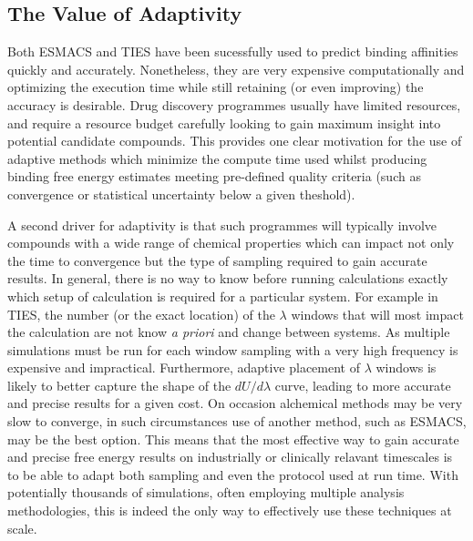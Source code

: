 
\subsection{The Value of Adaptivity}

Both ESMACS and TIES have been sucessfully used to predict binding affinities
quickly and accurately. 
Nonetheless, they are very expensive computationally and
optimizing the execution time while still retaining (or even improving) the accuracy is desirable. 
Drug discovery programmes usually have limited resources, and 
require a resource budget carefully looking to gain maximum insight 
into potential candidate compounds.
This provides one clear motivation for the use of adaptive methods 
which minimize the compute time used whilst producing binding free energy estimates 
meeting pre-defined quality criteria (such as convergence or 
statistical uncertainty below a given theshold).

A second driver for adaptivity is that such programmes will typically involve compounds with 
a wide range of chemical properties which can impact not only 
the time to convergence but the type of sampling required to gain
accurate results.
In general, there is no way to know before running calculations 
exactly which setup of calculation is required for a particular 
system.
For example in TIES, the number (or the exact location) of the $\lambda$ windows 
that will most impact the calculation are not know \textit{a priori} 
and change between systems.
As multiple simulations must be run for each window sampling with a very high frequency is expensive and impractical.
Furthermore, adaptive placement of $\lambda$ windows is likely to better capture the shape of the $dU/d\lambda$ curve, leading to more accurate and precise results for a given cost.
On occasion alchemical methods may be very slow to converge, 
in such circumstances use of another method, such as ESMACS, 
may be the best option.
This means that the most effective way to gain accurate and 
precise free energy results on industrially or clinically 
relavant timescales is to be able to adapt both sampling 
and even the protocol used at run time.
With potentially thousands of simulations, often employing 
multiple analysis methodologies, this is indeed the only way to 
effectively use these techniques at scale.

